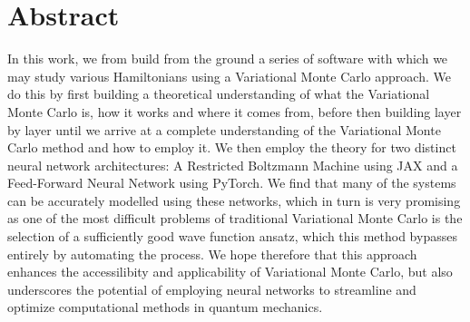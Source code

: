 \documentclass[12pt]{article}
\begin{document}
{\setlength{\parindent}{0cm}
\renewcommand \thepart{\arabic{part}}
\renewcommand \thesection{\arabic{part}.\arabic{section}}



\nocite{qmbook1}
\nocite{qmbook2}
\nocite{fys2140}
\nocite{fys3110}
\nocite{fys3150}
\nocite{fys4411}
\nocite{fysstk3155}
\nocite{fys5429}
\nocite{gab}
\nocite{zaheer2018deepsets}

\newpage
\part*{Abstract}
In this work, we from build from the ground a series of software with which we may study various Hamiltonians using a Variational Monte Carlo approach. We do this by first building a theoretical understanding of what the Variational Monte Carlo is, how it works and where it comes from, before then building layer by layer until we arrive at a complete understanding of the Variational Monte Carlo method and how to employ it. \newline
We then employ the theory for two distinct neural network architectures: A Restricted Boltzmann Machine using JAX and a Feed-Forward Neural Network using PyTorch. We find that many of the systems can be accurately modelled using these networks, which in turn is very promising as one of the most difficult problems of traditional Variational Monte Carlo is the selection of a sufficiently good wave function ansatz, which this method bypasses entirely by automating the process.
\newline
We hope therefore that this approach enhances the accessilibity and applicability of Variational Monte Carlo, but also underscores the potential of employing neural networks to streamline and optimize computational methods in quantum mechanics.
\newpage
}
\end{document}
